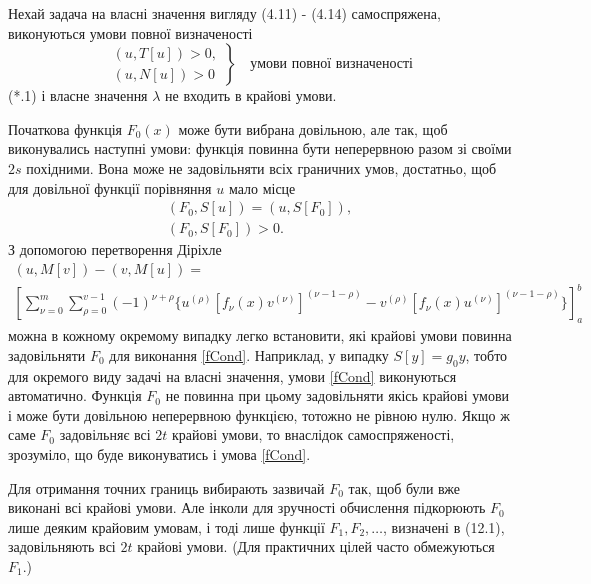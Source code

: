 \documentclass[12pt,a4paper]{article}
\begin{document}
Нехай задача на власні значення вигляду (4.11) - (4.14) самоспряжена, виконуються умови повної визначеності
\begin{equation*}
\left. \begin{array}{l}
	(u, T[u]) > 0,\\
	(u, N[u]) > 0
\end{array} \right\}
\quad \text{умови повної визначеності}
\tag{*.1}
\end{equation*}
 (*.1) і власне значення $\lambda$ не входить в крайові умови.

Початкова функція $F_0(x)$ може бути вибрана довільною, але так, щоб виконувались наступні умови: функція повинна бути неперервною разом зі своїми $2s$ похідними. Вона може не задовільняти всіх граничних умов, достатньо, щоб для довільної функції порівняння $u$ мало місце
\begin{equation}\label{fCond}
\begin{array}{l}
	(F_0, S[u]) = (u, S[F_0]),\\
	(F_0, S[F_0]) > 0.
\end{array}
\end{equation}
З допомогою перетворення Діріхле 
\begin{equation*}
\begin{array}{l}
	(u,M[v])-(v,M[u]) =\\
	\left[
	\sum_{\nu=0}^m \sum_{\rho=0}^{v-1}
		(-1)^{\nu+\rho}
		\{
		 u^{(\rho)}[f_{\nu}(x)v^{(\nu)}]^{(\nu-1-\rho)}
		-v^{(\rho)}[f_{\nu}(x)u^{(\nu)}]^{(\nu-1-\rho)}
		\}
	\right]_a^b
\end{array}
\tag{*.2}
\end{equation*}
можна в кожному окремому випадку легко встановити, які крайові умови повинна задовільняти $F_0$ для виконання \eqref{fCond}. Наприклад, у випадку $S[y]=g_0 y$, тобто для окремого виду задачі на власні значення, умови \eqref{fCond} виконуються автоматично. Функція $F_0$ не повинна при цьому задовільняти якісь крайові умови і може бути довільною неперервною функцією, тотожно не рівною нулю. Якщо ж саме $F_0$ задовільняє всі $2t$ крайові умови, то внаслідок самоспряженості, зрозуміло, що буде виконуватись і умова \eqref{fCond}.

Для отримання точних границь вибирають зазвичай $F_0$ так, щоб були вже виконані всі крайові умови. Але інколи для зручності обчислення підкорюють $F_0$ лише деяким крайовим умовам, і тоді лише функції $F_1, F_2, \dots$, визначені в (12.1), задовільняють всі $2t$ крайові умови. (Для практичних цілей часто обмежуються $F_1$.)
\end{document}
